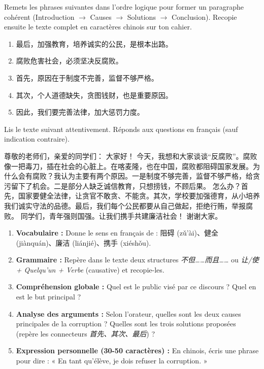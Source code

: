 \documentclass[11pt]{article}
\newcounter{popsec}
\newcounter{popsub}
\newcommand{\courssub}[1]{%
  \stepcounter{popsub}%
  \par\vspace{9pt}\noindent{\popxbold\fontsize{11.5}{13}\selectfont\color{popink}{\color{poporange}\thepopsec.\thepopsub}\hspace{6pt}#1}\par\nopagebreak\vspace{4pt}
}
\begin{document}
\begin{exercice}
Remets les phrases suivantes dans l'ordre logique pour former un paragraphe cohérent (Introduction $\rightarrow$ Causes $\rightarrow$ Solutions $\rightarrow$ Conclusion). Recopie ensuite le texte complet en caractères chinois sur ton cahier.

\begin{enumerate}
    \item 最后，加强教育，培养诚实的公民，是根本出路。
    \item 腐败危害社会，必须坚决反腐败。
    \item 首先，原因在于制度不完善，监督不够严格。
    \item 其次，个人道德缺失，贪图钱财，也是重要原因。
    \item 因此，我们要完善法律，加大惩罚力度。
\end{enumerate}
\end{exercice}

\courssub{Je me prépare au Bac}

\begin{exercice}
Lis le texte suivant attentivement. Réponds aux questions en français (sauf indication contraire).

\begin{textebox}
尊敬的老师们，亲爱的同学们：
大家好！
今天，我想和大家谈谈“反腐败”。腐败像一把毒刀，插在社会的心脏上。在喀麦隆，也在中国，腐败都阻碍国家发展。为什么会有腐败？我认为主要有两个原因。一是制度不够完善，监督不够严格，给贪污留下了机会。二是部分人缺乏诚信教育，只想捞钱，不顾后果。
怎么办？首先，国家要健全法律，让贪官不敢贪、不能贪。其次，学校要加强德育，从小培养我们诚实守法的品德。最后，我们每个公民都要从自己做起，拒绝行贿，举报腐败。
同学们，青年强则国强。让我们携手共建廉洁社会！
谢谢大家。
\end{textebox}

\begin{enumerate}
    \item \textbf{Vocabulaire :} Donne le sens en français de : 阻碍 (zǔ'ài)、健全 (jiànquán)、廉洁 (liánjié)、携手 (xiéshǒu).
    \item \textbf{Grammaire :} Repère dans le texte deux structures \emph{不但……而且……} ou \emph{让/使 + Quelqu'un + Verbe} (causative) et recopie-les.
    \item \textbf{Compréhension globale :} Quel est le public visé par ce discours ? Quel en est le but principal ?
    \item \textbf{Analyse des arguments :} Selon l'orateur, quelles sont les deux causes principales de la corruption ? Quelles sont les trois solutions proposées (repère les connecteurs \emph{首先、其次、最后}) ?
    \item \textbf{Expression personnelle (30-50 caractères) :} En chinois, écris une phrase pour dire : « En tant qu'élève, je dois refuser la corruption. »
\end{enumerate}
\end{exercice}
\end{document}
